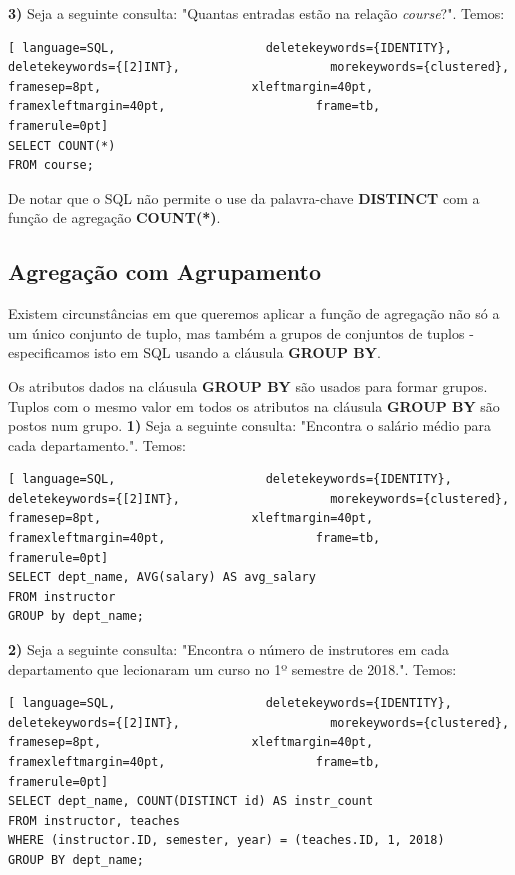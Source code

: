 \documentclass[titlepage]{book}
\theoremstyle{definition}
\begin{document}
\textbf{3)} Seja a seguinte consulta: "Quantas entradas estão na relação \textit{course}?". Temos:
\begin{lstlisting}[ language=SQL,                     deletekeywords={IDENTITY},                     deletekeywords={[2]INT},                     morekeywords={clustered},                     framesep=8pt,                     xleftmargin=40pt,                     framexleftmargin=40pt,                     frame=tb,                     framerule=0pt]
SELECT COUNT(*)
FROM course;
\end{lstlisting}
De notar que o SQL não permite o use da palavra-chave \textbf{DISTINCT} com a função de agregação \textbf{COUNT(*)}.

\subsection{Agregação com Agrupamento}
Existem circunstâncias em que queremos aplicar a função de agregação não só a um único conjunto de tuplo, mas também a grupos de conjuntos de tuplos - especificamos isto em SQL usando a cláusula \textbf{GROUP BY}. 

Os atributos dados na cláusula \textbf{GROUP BY} são usados para formar grupos. Tuplos com o mesmo valor em todos os atributos na cláusula \textbf{GROUP BY} são postos num grupo.
\textbf{1)} Seja a seguinte consulta: "Encontra o salário médio para cada departamento.". Temos:
\begin{lstlisting}[ language=SQL,                     deletekeywords={IDENTITY},                     deletekeywords={[2]INT},                     morekeywords={clustered},                     framesep=8pt,                     xleftmargin=40pt,                     framexleftmargin=40pt,                     frame=tb,                     framerule=0pt]
SELECT dept_name, AVG(salary) AS avg_salary
FROM instructor
GROUP by dept_name;
\end{lstlisting}

\textbf{2)} Seja a seguinte consulta: "Encontra o número de instrutores em cada departamento que lecionaram um curso no 1º semestre de 2018.". Temos:
\begin{lstlisting}[ language=SQL,                     deletekeywords={IDENTITY},                     deletekeywords={[2]INT},                     morekeywords={clustered},                     framesep=8pt,                     xleftmargin=40pt,                     framexleftmargin=40pt,                     frame=tb,                     framerule=0pt]
SELECT dept_name, COUNT(DISTINCT id) AS instr_count
FROM instructor, teaches
WHERE (instructor.ID, semester, year) = (teaches.ID, 1, 2018)
GROUP BY dept_name;
\end{lstlisting}
\end{document}
